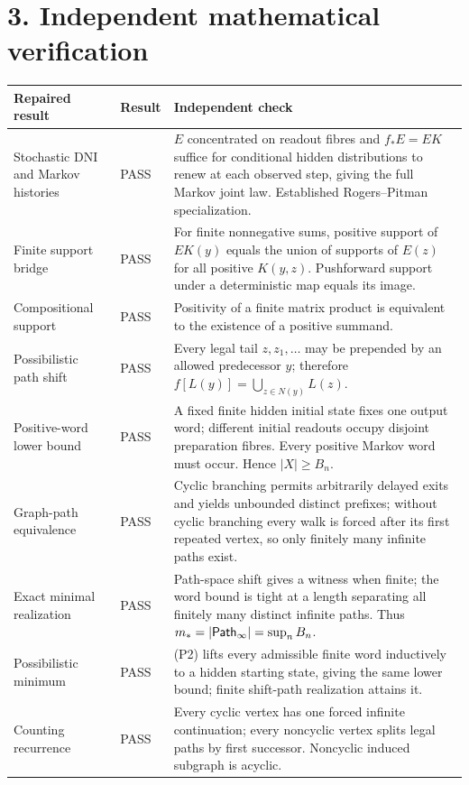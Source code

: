 \documentclass[11pt,letterpaper]{article}
\begin{document}
\section*{3. Independent mathematical verification}
\small
\begin{longtable}{@{}p{.30\linewidth}p{.14\linewidth}p{.49\linewidth}@{}}
\toprule
\textbf{Repaired result} & \textbf{Result} & \textbf{Independent check}\\\midrule
\endhead
Stochastic DNI and Markov histories & PASS & $E$ concentrated on readout fibres and $f_*E=EK$ suffice for conditional hidden distributions to renew at each observed step, giving the full Markov joint law. Established Rogers--Pitman specialization.\\
Finite support bridge & PASS & For finite nonnegative sums, positive support of $EK(y)$ equals the union of supports of $E(z)$ for all positive $K(y,z)$. Pushforward support under a deterministic map equals its image.\\
Compositional support & PASS & Positivity of a finite matrix product is equivalent to the existence of a positive summand.\\
Possibilistic path shift & PASS & Every legal tail $z,z_1,\ldots$ may be prepended by an allowed predecessor $y$; therefore $f[L(y)]=\bigcup_{z\in N(y)}L(z)$.\\
Positive-word lower bound & PASS & A fixed finite hidden initial state fixes one output word; different initial readouts occupy disjoint preparation fibres. Every positive Markov word must occur. Hence $|X|\ge B_n$.\\
Graph-path equivalence & PASS & Cyclic branching permits arbitrarily delayed exits and yields unbounded distinct prefixes; without cyclic branching every walk is forced after its first repeated vertex, so only finitely many infinite paths exist.\\
Exact minimal realization & PASS & Path-space shift gives a witness when finite; the word bound is tight at a length separating all finitely many distinct infinite paths. Thus $m_*=|\mathsf{Path}_\infty|=\sup_nB_n$.\\
Possibilistic minimum & PASS & (P2) lifts every admissible finite word inductively to a hidden starting state, giving the same lower bound; finite shift-path realization attains it.\\
Counting recurrence & PASS & Every cyclic vertex has one forced infinite continuation; every noncyclic vertex splits legal paths by first successor. Noncyclic induced subgraph is acyclic.\\

\end{longtable}
\end{document}
